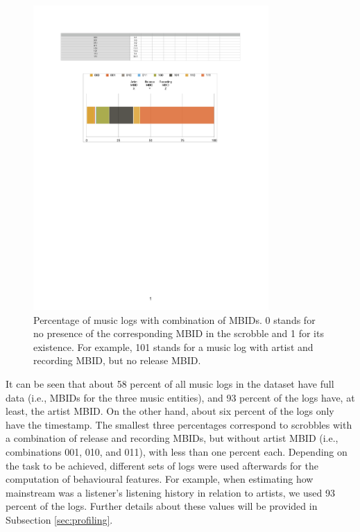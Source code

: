 \begin{figure}[!h]
\vspace{1em}
\centering
\includegraphics[width=0.80\textwidth]{mbid_combinations_crop.pdf}
\caption[Percentage of music logs with combination of MBIDs]{Percentage of music logs with combination of MBIDs. 0 stands for no presence of the corresponding MBID in the scrobble and 1 for its existence. For example, 101 stands for a music log with artist and recording MBID, but no release MBID.}
\label{fig:mbid_combinations_crop}
\end{figure}



 It can be seen that about 58 percent of all music logs in the dataset have full data (i.e., MBIDs for the three music entities), and 93 percent of the logs have, at least, the artist MBID. On the other hand, about six percent of the logs only have the timestamp. The smallest three percentages correspond to scrobbles with a combination of release and recording MBIDs, but without artist MBID (i.e., combinations 001, 010, and 011), with less than one percent each. Depending on the task to be achieved, different sets of logs were used afterwards for the computation of behavioural features. For example, when estimating how mainstream was a listener's listening history in relation to artists, we used 93 percent of the logs. Further details about these values will be provided in Subsection \ref{sec:profiling}.



